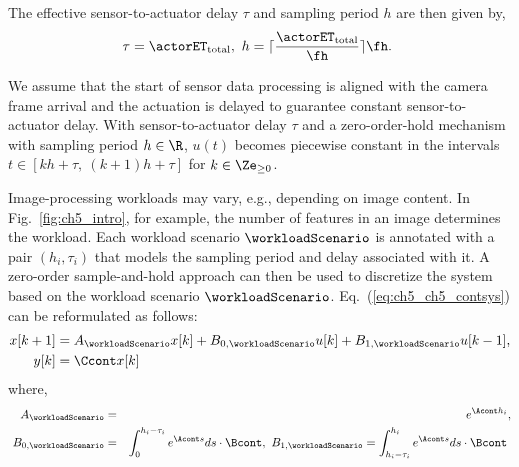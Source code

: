 The effective sensor-to-actuator delay $\tau$ and sampling period $h$ are then given by,
\begin{eqnarray}
\tau= \actorET_{\text{total}},\ h=\lceil \frac{\actorET_{\text{total}}}{\fh}\rceil \fh.\
\nonumber
\end{eqnarray}

We assume that the start of sensor data processing is aligned with the camera frame arrival and the actuation is delayed to guarantee constant sensor-to-actuator delay.
With sensor-to-actuator delay $\tau$ and a zero-order-hold mechanism with sampling
period $h \in \R$, $u(t)$ becomes piecewise constant in the intervals $t \in [kh + \tau,\ (k + 1)h + \tau ]$ for $k \in \Ze_{\geq 0}$. 

Image-processing workloads may vary, e.g., depending on image content. In Fig.~\ref{fig:ch5_intro}, for example, the number of features in an image determines the workload. Each workload scenario $\workloadScenario$ is annotated with a pair $(h_i,\tau_i)$ that models the sampling period and delay associated with it.
 A zero-order sample-and-hold approach can then be used to discretize the system based on the workload scenario $\workloadScenario$. Eq.~(\ref{eq:ch5_ch5_contsys}) can be reformulated as follows:
 \begin{align}
 \label{eq:ch5_ch5_sd_1}
x[k+1] &= A_{\workloadScenario} x[k] + B_{0,\workloadScenario} u[k] + B_{1,\workloadScenario} u[k-1],\nonumber \\
y[k] &= \Ccont x[k]
\end{align}
where,
\small
\begin{eqnarray}
A_{\workloadScenario} &=& e^{\Acont h_i}, \nonumber\\ 
~B_{0,\workloadScenario} &=& \int_{0}^{h_i-\tau_i} e^{\Acont s}ds\cdot \Bcont,~B_{1,\workloadScenario} = \int_{h_i-\tau_i}^{h_i} e^{\Acont s}ds\cdot \Bcont   ~\label{eq:ch5_ch5_A_sk}
\end{eqnarray}
\normalsize

